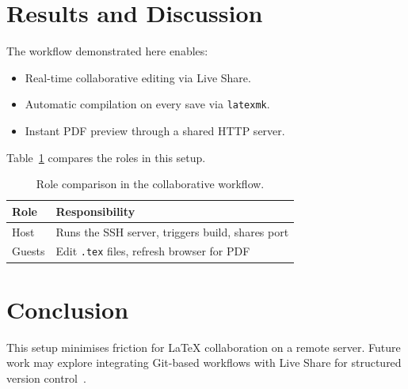 \documentclass[11pt,a4paper]{article}
\begin{document}
\section{Results and Discussion}
\label{sec:results}

The workflow demonstrated here enables:

\begin{itemize}
    \item Real-time collaborative editing via Live Share.
    \item Automatic compilation on every save via \texttt{latexmk}.
    \item Instant PDF preview through a shared HTTP server.
\end{itemize}

Table~\ref{tab:comparison} compares the roles in this setup.

\begin{table}[htbp]
    \centering
    \caption{Role comparison in the collaborative workflow.}
    \label{tab:comparison}
    \begin{tabular}{l|l}
        \hline
        \textbf{Role} & \textbf{Responsibility} \\
        \hline
        Host   & Runs the SSH server, triggers build, shares port \\
        Guests & Edit \texttt{.tex} files, refresh browser for PDF \\
        \hline
    \end{tabular}
\end{table}

\section{Conclusion}
\label{sec:conclusion}

This setup minimises friction for LaTeX collaboration on a remote server.
Future work may explore integrating Git-based workflows with Live Share for
structured version control~\citep{knuthwebsite}.



\end{document}
